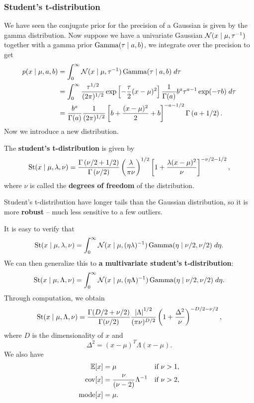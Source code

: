 \documentclass[a4paper]{article}
\begin{document}
\subsubsection{Student's t-distribution}

We have seen the conjugate prior for the precision 
of a Gaussian is given by the gamma distribution. Now 
suppose we have a univariate Gaussian $\mathcal{N}(x \mid \mu, 
\tau^{-1})$ together with a gamma prior $\operatorname{Gamma} (\tau \mid 
a, b)$, we integrate over the precision to get
\[
\begin{aligned}
p(x \mid \mu, a, b) 
&= \int_0^\infty \mathcal{N}(x \mid \mu, \tau^{-1}) 
\operatorname{Gamma}(\tau \mid a, b) \; d \tau \\
&= \int_0^\infty \frac{\tau^{1 / 2}}{(2 \pi)^{1 / 2}} 
\exp \left[ -\frac{\tau}{2} (x - \mu)^2 \right] 
\frac{1}{\Gamma(a)} b^a \tau^{a - 1} \exp (- \tau b) \; d \tau \\
&= \frac{b^a}{\Gamma(a)} \frac{1}{(2 \pi)^{1 / 2}} 
\left[ b + \frac{(x - \mu)^2}{2} + b \right]^{- a - 1 / 2}
\Gamma \left( a + 1 / 2 \right).
\end{aligned}
\]
Now we introduce a new distribution.
\begin{defi}
The \textbf{student's t-distribution} is given by 
\[
\operatorname{St} (x \mid \mu, \lambda, \nu)
= \frac{\Gamma \left( \nu / 2 + 1 / 2 \right)}
{\Gamma \left( \nu / 2 \right)} 
\left( \frac{\lambda}{\pi \nu} \right)^{1 / 2} 
\left[ 1 + \frac{\lambda (x - \mu)^2}{\nu} \right]^{ - 
\nu / 2 - 1 / 2},
\]
where $\nu$ is called the \textbf{degrees of freedom}
of the distribution.
\end{defi}

Student's t-distribution have longer tails than the 
Gaussian distribution, so it is more \textbf{robust} 
-- much less sensitive to a few outliers.

It is easy to verify that 
\[
\operatorname{St}(x \mid \mu, \lambda, \nu) 
= \int_0^\infty \mathcal{N}(x \mid \mu, (\eta \lambda)^{-1})
\operatorname{Gamma} (\eta \mid \nu / 2, \nu / 2) \; d \eta.
\]
We can then generalize this to \textbf{a multivariate 
student's t-distribution}: 
\[
\operatorname{St} (x \mid \mu, \Lambda, \nu) 
= \int_0^\infty \mathcal{N}(x \mid \mu, (\eta \Lambda)^{-1}) 
\operatorname{Gamma}(\eta \mid \nu / 2, \nu / 2) \; d \eta.
\]
Through computation, we obtain 
\[
\operatorname{St} (x \mid \mu, \Lambda, \nu) 
= \frac{\Gamma(D / 2 + \nu / 2)}{\Gamma(\nu / 2)} 
\frac{\left\lvert \Lambda\right\rvert^{1 / 2}}{(\pi \nu)^{D / 2}}
\left( 1 + \frac{\Delta^2}{\nu} \right)^{- D / 2 - 
\nu / 2},
\]
where $D$ is the dimensionality of $x$ and 
\[
\Delta^2 = (x - \mu)^T \Lambda (x - \mu).
\]
We also have 
\[
\begin{aligned}
  \mathbb{E}[x] &= \mu & \text{if $\nu > 1$}, \\
  \operatorname{cov}[x] &= \frac{\nu}{(\nu - 2)} \Lambda^{-1} 
  & \text{if $\nu > 2$}, \\
  \operatorname{mode}[x] &= \mu.
\end{aligned}
\]
\end{document}
